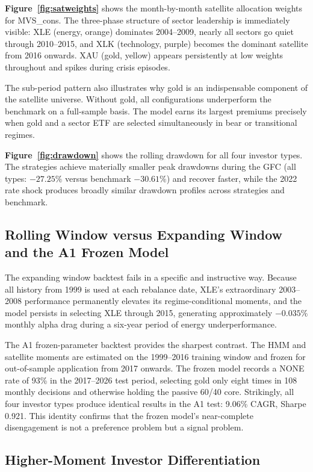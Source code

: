 \documentclass[12pt, a4paper]{article}
\begin{document}
\textbf{Figure~\ref{fig:satweights}} shows the month-by-month satellite allocation weights for MVS\_cons. The three-phase structure of sector leadership is immediately visible: XLE (energy, orange) dominates 2004--2009, nearly all sectors go quiet through 2010--2015, and XLK (technology, purple) becomes the dominant satellite from 2016 onwards. XAU (gold, yellow) appears persistently at low weights throughout and spikes during crisis episodes.


The sub-period pattern also illustrates why gold is an indispensable component of the
satellite universe. Without gold, all configurations underperform the benchmark on a
full-sample basis. The model earns its largest premiums precisely when gold and a sector ETF
are selected simultaneously in bear or transitional regimes.

\textbf{Figure~\ref{fig:drawdown}} shows the rolling drawdown for all four investor types. The strategies achieve materially smaller peak drawdowns during the GFC (all types: $-27.25\%$ versus benchmark $-30.61\%$) and recover faster, while the 2022 rate shock produces broadly similar drawdown profiles across strategies and benchmark.


\subsection{Rolling Window versus Expanding Window and the A1 Frozen Model}

The expanding window backtest fails in a specific and instructive way. Because all history
from 1999 is used at each rebalance date, XLE's extraordinary 2003--2008 performance
permanently elevates its regime-conditional moments, and the model persists in selecting XLE
through 2015, generating approximately $-0.035\%$ monthly alpha drag during a six-year
period of energy underperformance.

The A1 frozen-parameter backtest provides the sharpest contrast. The HMM and satellite
moments are estimated on the 1999--2016 training window and frozen for out-of-sample
application from 2017 onwards. The frozen model records a NONE rate of 93\% in the
2017--2026 test period, selecting gold only eight times in 108 monthly decisions and
otherwise holding the passive 60/40 core. Strikingly, all four investor types produce
identical results in the A1 test: 9.06\% CAGR, Sharpe 0.921. This identity confirms that
the frozen model's near-complete disengagement is not a preference problem but a signal
problem.

\subsection{Higher-Moment Investor Differentiation}
\end{document}
